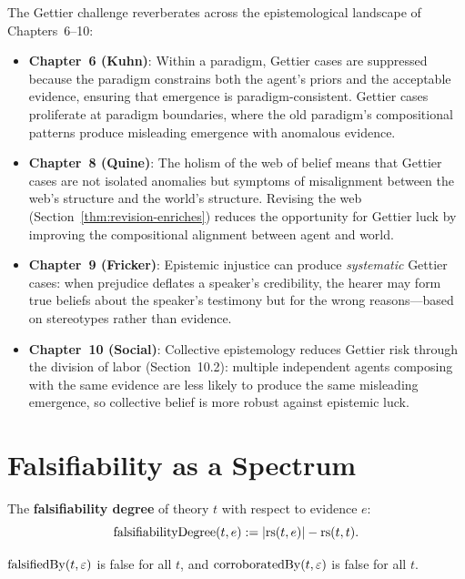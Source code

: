 \begin{remark}
The Gettier challenge reverberates across the epistemological landscape of
Chapters~6--10:

\begin{itemize}
\item \textbf{Chapter~6 (Kuhn)}: Within a paradigm, Gettier cases are
  suppressed because the paradigm constrains both the agent's priors and the
  acceptable evidence, ensuring that emergence is paradigm-consistent. Gettier
  cases proliferate at paradigm boundaries, where the old paradigm's
  compositional patterns produce misleading emergence with anomalous evidence.
\item \textbf{Chapter~8 (Quine)}: The holism of the web of belief means that
  Gettier cases are not isolated anomalies but symptoms of misalignment between
  the web's structure and the world's structure. Revising the web
  (Section~\ref{thm:revision-enriches}) reduces the opportunity for Gettier
  luck by improving the compositional alignment between agent and world.
\item \textbf{Chapter~9 (Fricker)}: Epistemic injustice can produce
  \emph{systematic} Gettier cases: when prejudice deflates a speaker's
  credibility, the hearer may form true beliefs about the speaker's testimony
  but for the wrong reasons---based on stereotypes rather than evidence.
\item \textbf{Chapter~10 (Social)}: Collective epistemology reduces Gettier
  risk through the division of labor (Section~10.2): multiple independent
  agents composing with the same evidence are less likely to produce the
  same misleading emergence, so collective belief is more robust against
  epistemic luck.
\end{itemize}
\end{remark}


\section{Falsifiability as a Spectrum}

\begin{definition}
\label{def:falsifiability-degree}
The \textbf{falsifiability degree} of theory $t$ with respect to evidence $e$:
\[
  \mathrm{falsifiabilityDegree}(t, e) := |\mathrm{rs}(t, e)| - \mathrm{rs}(t, t).
\]
\end{definition}

\begin{theorem}
\label{thm:void-evidence}
$\mathrm{falsifiedBy}(t, \varepsilon)$ is false for all $t$, and
$\mathrm{corroboratedBy}(t, \varepsilon)$ is false for all $t$.
\end{theorem}

